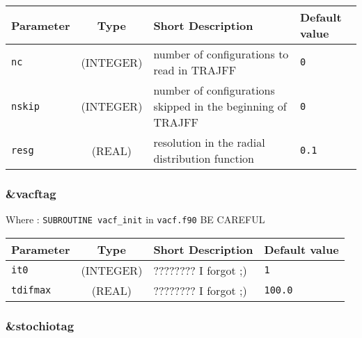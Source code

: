 \documentclass[a4paper]{article}
\begin{document}
\begin{longtable}{l|c|m{8cm}|m{2cm}}
\hline
\hline
Parameter        &  Type              &          Short Description                                                          & Default value \\
\hline
\hline
\rule[-0.75cm]{0cm}{1.5cm}
\verb?nc?        & (INTEGER)          & number of configurations to read in TRAJFF                                          & \verb?0? \\
\rule[-0.75cm]{0cm}{1.5cm}
\verb?nskip?     & (INTEGER)          & number of configurations skipped in the beginning of TRAJFF                         & \verb?0? \\
\rule[-0.75cm]{0cm}{1.5cm}
\verb?resg?      & (REAL)             & resolution in the radial distribution function                                      & \verb?0.1? \\
\hline
\hline
\end{longtable}

\subsubsection{\&vacftag}

Where : \verb?SUBROUTINE vacf_init? in \verb?vacf.f90?
BE CAREFUL
\newline

\begin{longtable}{l|c|m{8cm}|m{2cm}}
\hline
\hline
Parameter        &  Type              &          Short Description                                                          & Default value \\
\hline
\hline
\rule[-0.75cm]{0cm}{1.5cm}
\verb?it0?       & (INTEGER)          & ???????? I forgot ;)                                                                & \verb?1? \\
\hline
\rule[-0.75cm]{0cm}{1.5cm}
\verb?tdifmax?   & (REAL)             & ???????? I forgot ;)                                                                & \verb?100.0? \\ 
\hline
\hline
\end{longtable}

\subsubsection{\&stochiotag }
\end{document}
